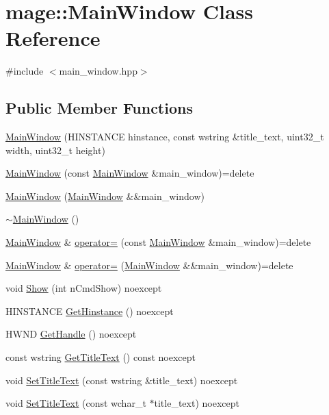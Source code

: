 \hypertarget{classmage_1_1_main_window}{}\section{mage\+:\+:Main\+Window Class Reference}
\label{classmage_1_1_main_window}


{\ttfamily \#include $<$main\+\_\+window.\+hpp$>$}

\subsection*{Public Member Functions}
\begin{DoxyCompactItemize}
\item 
\hyperlink{classmage_1_1_main_window_afb4311bbdaeb24cf4bac3e671051ca00}{Main\+Window} (H\+I\+N\+S\+T\+A\+N\+CE hinstance, const wstring \&title\+\_\+text, uint32\+\_\+t width, uint32\+\_\+t height)
\item 
\hyperlink{classmage_1_1_main_window_a8dc3c590bb168f8178a7db72ff60fd0c}{Main\+Window} (const \hyperlink{classmage_1_1_main_window}{Main\+Window} \&main\+\_\+window)=delete
\item 
\hyperlink{classmage_1_1_main_window_ab5c9cc962420580c62dd2b44c142cf4b}{Main\+Window} (\hyperlink{classmage_1_1_main_window}{Main\+Window} \&\&main\+\_\+window)
\item 
\hyperlink{classmage_1_1_main_window_ada7ecf97d82ce08ba2f31f0afd891031}{$\sim$\+Main\+Window} ()
\item 
\hyperlink{classmage_1_1_main_window}{Main\+Window} \& \hyperlink{classmage_1_1_main_window_a0c2414ae4e627fb401c045371c286de0}{operator=} (const \hyperlink{classmage_1_1_main_window}{Main\+Window} \&main\+\_\+window)=delete
\item 
\hyperlink{classmage_1_1_main_window}{Main\+Window} \& \hyperlink{classmage_1_1_main_window_a684d547966f69ef5df793b5ce516f76a}{operator=} (\hyperlink{classmage_1_1_main_window}{Main\+Window} \&\&main\+\_\+window)=delete
\item 
void \hyperlink{classmage_1_1_main_window_abbb86e7f4dab1b43ca28f83e265f511e}{Show} (int n\+Cmd\+Show) noexcept
\item 
H\+I\+N\+S\+T\+A\+N\+CE \hyperlink{classmage_1_1_main_window_a1b8c851147ea3b51e645c2fce961fe17}{Get\+Hinstance} () noexcept
\item 
H\+W\+ND \hyperlink{classmage_1_1_main_window_ab4520f7c5ef0828535a117a8512221b5}{Get\+Handle} () noexcept
\item 
const wstring \hyperlink{classmage_1_1_main_window_a16ea3780659e00c8e4732b518c7c4a1e}{Get\+Title\+Text} () const noexcept
\item 
void \hyperlink{classmage_1_1_main_window_aaadd51dc2b902d93ea2f28d685477301}{Set\+Title\+Text} (const wstring \&title\+\_\+text) noexcept
\item 
void \hyperlink{classmage_1_1_main_window_a1baa8554782be197fb5932c3af461f0e}{Set\+Title\+Text} (const wchar\+\_\+t $\ast$title\+\_\+text) noexcept
\end{DoxyCompactItemize}
